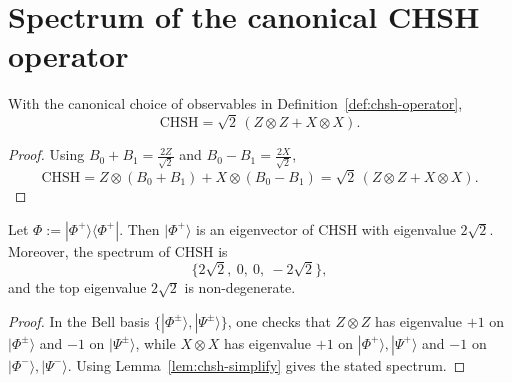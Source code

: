 \section{Spectrum of the canonical CHSH operator}

\begin{lemma}
\label{lem:chsh-simplify}
\notready
With the canonical choice of observables in Definition~\ref{def:chsh-operator},
\[
\mathrm{CHSH} = \sqrt 2\,(Z\otimes Z + X\otimes X).
\]
\end{lemma}

\begin{proof}
Using $B_0+B_1=\tfrac{2Z}{\sqrt2}$ and $B_0-B_1=\tfrac{2X}{\sqrt2}$,
\[
\mathrm{CHSH}=Z\otimes(B_0+B_1)+X\otimes(B_0-B_1)=\sqrt2\,(Z\otimes Z + X\otimes X).
\]
\end{proof}

\begin{lemma}
\label{lem:chsh-eigenvalues}
\notready
Let $\Phi:=|\Phi^+\rangle\!\langle\Phi^+|$.
Then $|\Phi^+\rangle$ is an eigenvector of $\mathrm{CHSH}$ with eigenvalue $2\sqrt2$.
Moreover, the spectrum of $\mathrm{CHSH}$ is
\[
\{2\sqrt2,\ 0,\ 0,\ -2\sqrt2\},
\]
and the top eigenvalue $2\sqrt2$ is non-degenerate.
\end{lemma}

\begin{proof}
In the Bell basis $\{|\Phi^\pm\rangle,|\Psi^\pm\rangle\}$, one checks that $Z\otimes Z$ has eigenvalue $+1$ on $|\Phi^\pm\rangle$ and $-1$ on $|\Psi^\pm\rangle$, while $X\otimes X$ has eigenvalue $+1$ on $|\Phi^+\rangle,|\Psi^+\rangle$ and $-1$ on $|\Phi^-\rangle,|\Psi^-\rangle$. Using Lemma~\ref{lem:chsh-simplify} gives the stated spectrum.
\end{proof}
